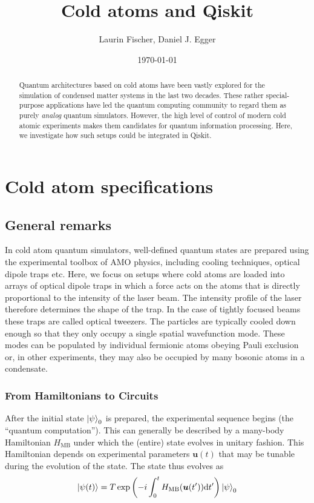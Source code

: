 \documentclass[a4paper, 10pt]{article}
\title{Cold atoms and Qiskit}
\author{Laurin Fischer, Daniel J. Egger}
\date{\today}
\begin{document}
\maketitle


\begin{abstract}
Quantum architectures based on cold atoms have been vastly explored for the simulation of condensed matter systems in the last two decades. These rather special-purpose applications have led the quantum computing community to regard them as purely \emph{analog} quantum simulators. However, the high level of control of modern cold atomic experiments makes them candidates for quantum information processing.
Here, we investigate how such setups could be integrated in Qiskit.
\end{abstract}

\section{Cold atom specifications}

\subsection{General remarks}
In cold atom quantum simulators, well-defined quantum states are prepared using the experimental toolbox of AMO physics, including cooling techniques, optical dipole traps etc.
Here, we focus on setups where cold atoms are loaded into arrays of optical dipole traps in which a force acts on the atoms that is directly proportional to the intensity of the laser beam. 
The intensity profile of the laser therefore determines the shape of the trap.
In the case of tightly focused beams these traps are called optical tweezers.
The particles are typically cooled down enough so that they only occupy a single spatial wavefunction mode.
These modes can be populated by individual fermionic atoms obeying Pauli exclusion or, in other experiments, they may also be occupied by many bosonic atoms in a condensate.

\subsubsection{From Hamiltonians to Circuits}

After the initial state $\ket{\psi}_0$ is prepared, the experimental sequence begins (the ``quantum computation'').
This can generally be described by a many-body Hamiltonian $H_{\text{MB}}$ under which the (entire) state evolves in unitary fashion.
This Hamiltonian depends on experimental parameters $\boldsymbol{u}(t)$ that may be tunable during the evolution of the state.
The state thus evolves as 
\begin{equation}
    \ket{\psi(t)} = T \exp{ \left( - i \int_0^t H_{\text{MB}}( \boldsymbol{u}(t')) \text{d}t' \right) } \ket{\psi}_0
\end{equation}
\end{document}
